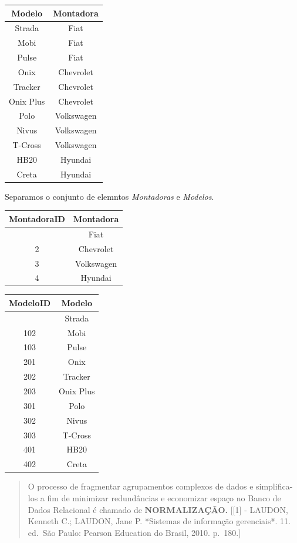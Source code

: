 \documentclass[
]{book}
\begin{document}
\begin{longtable}[]{@{}cc@{}}
\toprule\noalign{}
Modelo & Montadora \\
\midrule\noalign{}
\endhead
\bottomrule\noalign{}
\endlastfoot
Strada & Fiat \\
Mobi & Fiat \\
Pulse & Fiat \\
Onix & Chevrolet \\
Tracker & Chevrolet \\
Onix Plus & Chevrolet \\
Polo & Volkswagen \\
Nivus & Volkswagen \\
T-Cross & Volkswagen \\
HB20 & Hyundai \\
Creta & Hyundai \\
\end{longtable}

Separamos o conjunto de elemntos \emph{Montadoras} e \emph{Modelos}.

\begin{longtable}[]{@{}cc@{}}
\toprule\noalign{}
MontadoraID & Montadora \\
\midrule\noalign{}
\endhead
\bottomrule\noalign{}
\endlastfoot
1 & Fiat \\
2 & Chevrolet \\
3 & Volkswagen \\
4 & Hyundai \\
\end{longtable}

\begin{longtable}[]{@{}cc@{}}
\toprule\noalign{}
ModeloID & Modelo \\
\midrule\noalign{}
\endhead
\bottomrule\noalign{}
\endlastfoot
101 & Strada \\
102 & Mobi \\
103 & Pulse \\
201 & Onix \\
202 & Tracker \\
203 & Onix Plus \\
301 & Polo \\
302 & Nivus \\
303 & T-Cross \\
401 & HB20 \\
402 & Creta \\
\end{longtable}

\begin{quote}
O processo de fragmentar agrupamentos complexos de dados e simplifica-los a fim de minimizar redundâncias e economizar espaço no Banco de Dados Relacional é chamado de \textbf{NORMALIZAÇÃO.} {[}{[}1{]} - LAUDON, Kenneth C.; LAUDON, Jane P. *Sistemas de informação gerenciais*. 11. ed.~São Paulo: Pearson Education do Brasil, 2010. p.~180.{]}
\end{quote}
\end{document}
